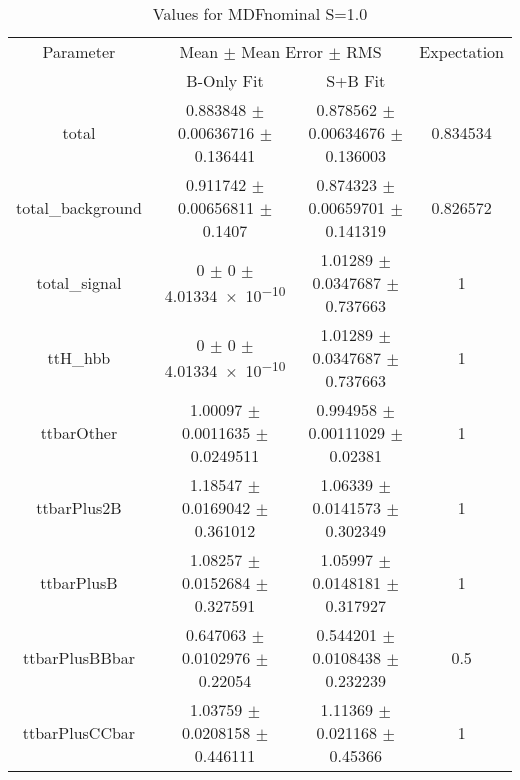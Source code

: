 \begin{table}
\centering
\caption{Values for MDFnominal S=1.0}
\begin{tabular}{cccc}
\toprule
Parameter & \multicolumn{2}{c}{Mean $\pm$ Mean Error $\pm$ RMS} & Expectation\\
 & B-Only Fit & S+B Fit & \\
\midrule
total & \num{0.883848} $\pm$ \num{0.00636716} $\pm$ \num{0.136441} & \num{0.878562} $\pm$ \num{0.00634676} $\pm$ \num{0.136003} & \num{0.834534}\\
total\_background & \num{0.911742} $\pm$ \num{0.00656811} $\pm$ \num{0.1407} & \num{0.874323} $\pm$ \num{0.00659701} $\pm$ \num{0.141319} & \num{0.826572}\\
total\_signal & \num{0} $\pm$ \num{0} $\pm$ \num{4.01334e-10} & \num{1.01289} $\pm$ \num{0.0347687} $\pm$ \num{0.737663} & \num{1}\\
ttH\_hbb & \num{0} $\pm$ \num{0} $\pm$ \num{4.01334e-10} & \num{1.01289} $\pm$ \num{0.0347687} $\pm$ \num{0.737663} & \num{1}\\
ttbarOther & \num{1.00097} $\pm$ \num{0.0011635} $\pm$ \num{0.0249511} & \num{0.994958} $\pm$ \num{0.00111029} $\pm$ \num{0.02381} & \num{1}\\
ttbarPlus2B & \num{1.18547} $\pm$ \num{0.0169042} $\pm$ \num{0.361012} & \num{1.06339} $\pm$ \num{0.0141573} $\pm$ \num{0.302349} & \num{1}\\
ttbarPlusB & \num{1.08257} $\pm$ \num{0.0152684} $\pm$ \num{0.327591} & \num{1.05997} $\pm$ \num{0.0148181} $\pm$ \num{0.317927} & \num{1}\\
ttbarPlusBBbar & \num{0.647063} $\pm$ \num{0.0102976} $\pm$ \num{0.22054} & \num{0.544201} $\pm$ \num{0.0108438} $\pm$ \num{0.232239} & \num{0.5}\\
ttbarPlusCCbar & \num{1.03759} $\pm$ \num{0.0208158} $\pm$ \num{0.446111} & \num{1.11369} $\pm$ \num{0.021168} $\pm$ \num{0.45366} & \num{1}\\
\bottomrule
\end{tabular}
\end{table}